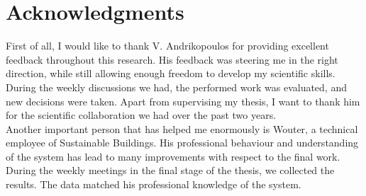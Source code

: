 



\bigskip

\begingroup
\let\clearpage\relax
\let\cleardoublepage\relax
\let\cleardoublepage\relax
\chapter*{Acknowledgments}
First of all, I would like to thank V. Andrikopoulos for providing excellent feedback throughout this research. His feedback was steering me in the right direction, while still allowing enough freedom to develop my scientific skills. During the weekly discussions we had, the performed work was evaluated, and new decisions were taken. Apart from supervising my thesis, I want to thank him for the scientific collaboration we had over the past two years.\\

\noindent
Another important person that has helped me enormously is Wouter, a technical employee of Sustainable Buildings. His professional behaviour and understanding of the system has lead to many improvements with respect to the final work. During the weekly meetings in the final stage of the thesis, we collected the results. The data matched his professional knowledge of the system.
\endgroup
